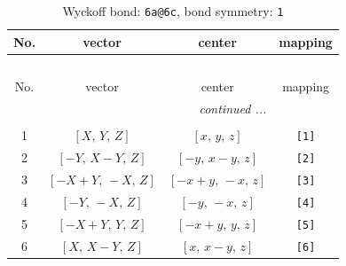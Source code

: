 \documentclass[fleqn,8pt]{jsarticle}
\begin{document}
\begin{longtable}{cccc}
\caption{Wyckoff bond: {\tt 6a@6c}, bond symmetry: {\tt 1}}
 \\
 \hline \hline
No. & vector & center & mapping \\ \hline \endfirsthead

\multicolumn{3}{l}{\tablename\ \thetable{}} \\
 \hline \hline
No. & vector & center & mapping \\ \hline \endhead

 \hline \hline
\multicolumn{3}{r}{\footnotesize\it continued ...} \\ \endfoot

 \hline \hline
\multicolumn{3}{r}{} \\ \endlastfoot

1 & $\left[ X,\, Y,\, Z \right]$ & $\left[ x,\, y,\, z \right]$ & {\tt [1]} \\ \hline
2 & $\left[ - Y,\, X - Y,\, Z \right]$ & $\left[ - y,\, x - y,\, z \right]$ & {\tt [2]} \\ \hline
3 & $\left[ - X + Y,\, - X,\, Z \right]$ & $\left[ - x + y,\, - x,\, z \right]$ & {\tt [3]} \\ \hline
4 & $\left[ - Y,\, - X,\, Z \right]$ & $\left[ - y,\, - x,\, z \right]$ & {\tt [4]} \\ \hline
5 & $\left[ - X + Y,\, Y,\, Z \right]$ & $\left[ - x + y,\, y,\, z \right]$ & {\tt [5]} \\ \hline
6 & $\left[ X,\, X - Y,\, Z \right]$ & $\left[ x,\, x - y,\, z \right]$ & {\tt [6]} \\
\end{longtable}
\end{document}
